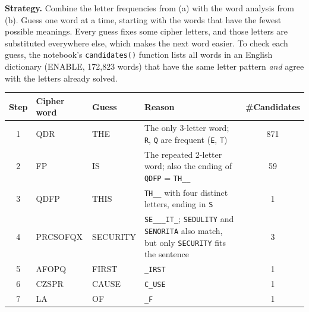 \documentclass[a4paper, 10pt]{article}
\begin{document}
\begin{problem}
\begin{subproblems_alpha}
\begin{solution}
		      \textbf{Strategy.} Combine the letter frequencies from (a) with the word analysis from (b).
		      Guess one word at a time, starting with the words that have the fewest possible meanings.
		      Every guess fixes some cipher letters, and those letters are substituted everywhere else, which makes the next word easier.
		      To check each guess, the notebook's \texttt{candidates()} function lists all words in an English dictionary
		      (ENABLE, 172{,}823 words) that have the same letter pattern \emph{and} agree with the letters already solved.
		      \begin{center}
			      \footnotesize
			      \begin{tabularx}{\linewidth}{c>{\ttfamily}l>{\ttfamily}lXc}
				      \toprule
				      Step & \normalfont Cipher word & \normalfont Guess & Reason                                                                                                                               & \#Candidates \\
				      \midrule
				      1    & QDR                     & THE               & The only 3-letter word; \texttt{R}, \texttt{Q} are frequent (\texttt{E}, \texttt{T})                                                 & 871          \\
				      2    & FP                      & IS                & The repeated 2-letter word; also the ending of \texttt{QDFP} = \texttt{TH\_\_}                                                       & 59           \\
				      3    & QDFP                    & THIS              & \texttt{TH\_\_} with four distinct letters, ending in \texttt{S}                                                                     & 1            \\
				      4    & PRCSOFQX                & SECURITY          & \texttt{SE\_\_\_IT\_}; \texttt{SEDULITY} and \texttt{SENORITA} also match, but only \texttt{SECURITY} fits the sentence              & 3            \\
				      5    & AFOPQ                   & FIRST             & \texttt{\_IRST}                                                                                                                      & 1            \\
				      6    & CZSPR                   & CAUSE             & \texttt{C\_USE}                                                                                                                      & 1            \\
				      7    & LA                      & OF                & \texttt{\_F}                                                                                                                         & 1            \\

\end{tabularx}
\end{center}
\end{solution}
\end{subproblems_alpha}
\end{problem}
\end{document}

